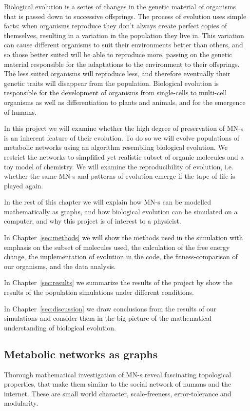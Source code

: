 \documentclass[a4paper,12pt]{article}
\begin{document}
	Biological evolution is a series of changes in the genetic material of organisms that is passed down to successive offsprings. The process of evolution uses simple facts: when organisms reproduce they don't always create perfect copies of themselves, resulting in a variation in the population they live in. This variation can cause different organisms to suit their environments better than others, and so those better suited will be able to reproduce more, passing on the genetic material responsible for the adaptations to the environment to their offsprings. The less suited organisms will reproduce less, and therefore eventually their genetic traits will disappear from the population. 
	 Biological evolution is responsible for the development of organisms from single-cells to multi-cell organisms as well as differentiation to plants and animals, and for the emergence of humans. 



	In this project we will examine whether the high degree of preservation  of MN-s is an inherent feature of their evolution. To do so we will evolve populations of metabolic networks using an algorithm resembling biological evolution. We restrict the networks to simplified yet realistic subset of organic molecules and a toy model of chemistry. We will examine the reproducibility of evolution, i.e. whether the same MN-s and patterns of evolution emerge if the tape of life is played again. 

	In the rest of this chapter we will explain how MN-s can be modelled mathematically as graphs, and how biological evolution can be simulated on a computer, and why this project is of interest to a physicist.

	In Chapter~\ref{sec:methods} we  will show the methods used in the simulation with emphasis on the subset of molecules used, the calculation of the free energy change, the implementation of evolution in the code, the fitness-comparison of our organisms, and the data analysis. 

	In Chapter~\ref{sec:results} we summarize the results of the project by show the results of the population simulations under different conditions.


	In Chapter~\ref{sec:discussion} we draw conclusions from the results of our simulations and consider them in the big picture of the mathematical understanding of biological evolution. 

	
	\subsection{Metabolic networks as graphs}
	Thorough mathematical investigation of MN-s reveal fascinating topological properties, that make them similar to the social network of humans and the internet. These are small world character, scale-freeness, error-tolerance \cite{largescale} and modularity.	
\end{document}
